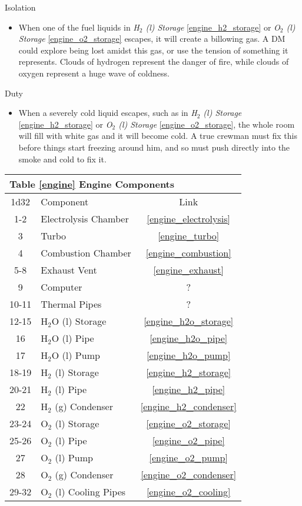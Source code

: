 \documentclass[a4paper]{article}
\begin{document}
\begin{minipage}[t]{0.4\linewidth}
Isolation
\begin{itemize}
\item When one of the fuel liquids in \textit{H$_2$ (l) Storage} \ref{engine_h2_storage} or \textit{O$_2$ (l) Storage} \ref{engine_o2_storage} escapes, it will create a billowing gas. A DM could explore being lost amidst this gas, or use the tension of something it represents. Clouds of hydrogen represent the danger of fire, while clouds of oxygen represent a huge wave of coldness. 
\end{itemize}
\end{minipage}
\begin{minipage}[t]{0.4\linewidth}
Duty
\begin{itemize}
\item When a severely cold liquid escapes, such as in \textit{H$_2$ (l) Storage} \ref{engine_h2_storage} or \textit{O$_2$ (l) Storage} \ref{engine_o2_storage}, the whole room will fill with white gas and it will become cold. A true crewman must fix this before things start freezing around him, and so must push directly into the smoke and cold to fix it.
\end{itemize}
\end{minipage}
 
\vspace{0.5cm} \hspace{0.25\linewidth}
\begin{tabular}{| c | l | c |}
\toprule
\multicolumn{3}{|l|}{Table \ref{engine} Engine Components} \\
\toprule
1d32 & Component & Link \\
\midrule
1-2 & Electrolysis Chamber & \ref{engine_electrolysis} \\
3 & Turbo & \ref{engine_turbo} \\
4 & Combustion Chamber & \ref{engine_combustion} \\
5-8 & Exhaust Vent & \ref{engine_exhaust} \\
9 & Computer & ? \\
10-11 & Thermal Pipes & ? \\
12-15 & H$_2$O (l) Storage & \ref{engine_h2o_storage} \\
16 & H$_2$O (l) Pipe & \ref{engine_h2o_pipe} \\
17 & H$_2$O (l) Pump & \ref{engine_h2o_pump} \\
18-19 & H$_2$ (l) Storage & \ref{engine_h2_storage} \\
20-21 & H$_2$ (l) Pipe & \ref{engine_h2_pipe} \\
22 & H$_2$ (g) Condenser & \ref{engine_h2_condenser} \\
23-24 & O$_2$ (l) Storage & \ref{engine_o2_storage} \\
25-26 & O$_2$ (l) Pipe & \ref{engine_o2_pipe} \\
27 & O$_2$ (l) Pump & \ref{engine_o2_pump} \\
28 & O$_2$ (g) Condenser & \ref{engine_o2_condenser} \\
29-32 & O$_2$ (l) Cooling Pipes & \ref{engine_o2_cooling} \\
\bottomrule
\end{tabular}
\end{document}
